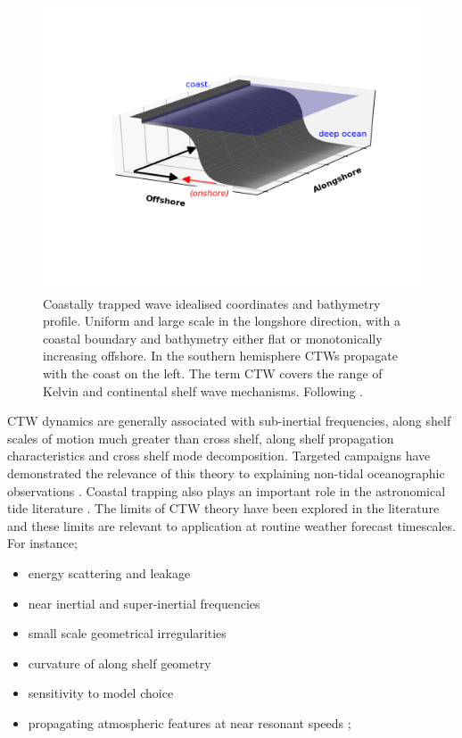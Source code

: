 \begin{figure}[H]\centering
    \noindent\includegraphics[width=\figwidthFull]{figures/diagrams/ctw_coords.png}
    \caption[Coastally trapped wave idealised coordinates]
             {Coastally trapped wave idealised coordinates and bathymetry profile. 
              Uniform and large scale in the longshore direction, with a coastal boundary and bathymetry either flat or monotonically increasing offshore. In the southern hemisphere CTWs propagate with the coast on the left. The term CTW covers the range of Kelvin and continental shelf wave mechanisms.  Following \protect\citep{Dale:2001dn}. }
    \label{fig:ctw_typical}
\end{figure}  
CTW dynamics are generally associated with
sub-inertial frequencies, 
along shelf scales of motion much greater than cross shelf,  
along shelf propagation characteristics
and cross shelf mode decomposition.
Targeted campaigns have demonstrated the relevance of this theory to explaining non-tidal oceanographic observations \citep{Church:1986tl,Merrifield:1992ef,Ding:2012im}.
Coastal trapping also plays an important role in the astronomical tide literature \citep{Anonymous:cyAnLqia}.
The limits of CTW theory have been explored in the literature and these limits are relevant to application at routine weather forecast timescales.
For instance; 
\begin{itemize}
\item energy scattering and leakage \citep{Middleton:1991dq, Merrifield:1994et, Yankovsky:2017en}
\item near inertial and super-inertial frequencies \citep{Dale:2001dn, Dale:1996go} 
\item small scale geometrical irregularities \citep{Wilkin:1990iw,Liao:2011}
\item curvature of along shelf geometry \citep{Grimshaw:1977vu}
\item sensitivity to model choice \citep{Sanson:2012bu}
\item propagating atmospheric features at near resonant speeds \citep{McInnes:2003vl};
\end{itemize}

